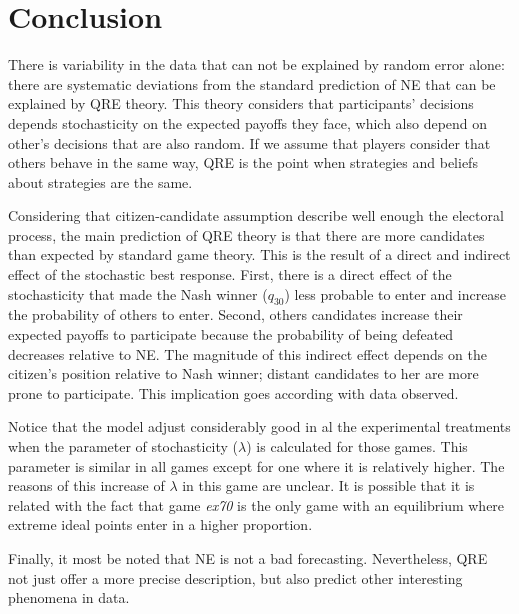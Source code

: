 \section{Conclusion}


There is variability in the data that can not be explained by random error alone: there are systematic deviations from the standard prediction of NE that can be explained by QRE theory. This theory considers that participants' decisions depends stochasticity on the expected payoffs they face, which also depend on other's decisions that are also random. If we assume that players consider that others behave in the same way, QRE is the point when strategies and beliefs about strategies are the same.  

Considering that citizen-candidate assumption describe well enough the electoral process, the main prediction of QRE theory is that there are more candidates than expected by standard game theory. %
This is the result of a direct and indirect effect of the stochastic best response. %
First, there is a direct effect of the stochasticity that made the Nash winner ($q_{30}$) less probable to enter and increase the probability of others to enter. 
Second, others candidates increase their expected payoffs to participate because the probability of being defeated decreases relative to NE. %
The magnitude of this indirect effect depends on the citizen's position relative to Nash winner; distant candidates to her are more prone to participate. This implication goes according with data observed.

Notice that the model adjust considerably good in al the experimental treatments when the parameter of stochasticity ($\lambda$) is calculated for those games. This parameter is similar in all games except for one where it is relatively higher. The reasons of this increase of $\lambda$ in this game are unclear. It is possible that it is related with the fact that game \textit{ex70} is the only game with an equilibrium where extreme ideal points enter in a higher proportion.

Finally, it most be noted that NE is not a bad forecasting. Nevertheless, QRE not just offer a more precise description, but also predict other interesting phenomena in data.